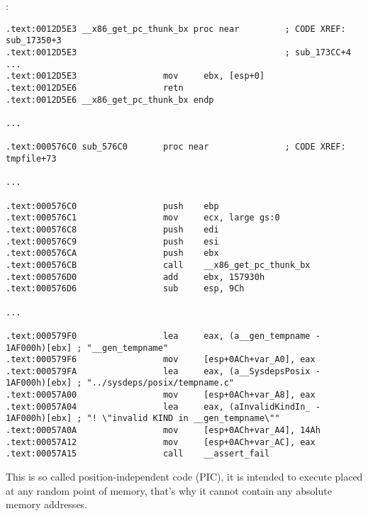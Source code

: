 ﻿\section{\CapitalPICcode}
\index{\PICcode}
\label{sec:PIC}

:

\begin{lstlisting}[caption=libc-2.17.so x86]
.text:0012D5E3 __x86_get_pc_thunk_bx proc near         ; CODE XREF: sub_17350+3
.text:0012D5E3                                         ; sub_173CC+4 ...
.text:0012D5E3                 mov     ebx, [esp+0]
.text:0012D5E6                 retn
.text:0012D5E6 __x86_get_pc_thunk_bx endp

...

.text:000576C0 sub_576C0       proc near               ; CODE XREF: tmpfile+73

...

.text:000576C0                 push    ebp
.text:000576C1                 mov     ecx, large gs:0
.text:000576C8                 push    edi
.text:000576C9                 push    esi
.text:000576CA                 push    ebx
.text:000576CB                 call    __x86_get_pc_thunk_bx
.text:000576D0                 add     ebx, 157930h
.text:000576D6                 sub     esp, 9Ch

...

.text:000579F0                 lea     eax, (a__gen_tempname - 1AF000h)[ebx] ; "__gen_tempname"
.text:000579F6                 mov     [esp+0ACh+var_A0], eax
.text:000579FA                 lea     eax, (a__SysdepsPosix - 1AF000h)[ebx] ; "../sysdeps/posix/tempname.c"
.text:00057A00                 mov     [esp+0ACh+var_A8], eax
.text:00057A04                 lea     eax, (aInvalidKindIn_ - 1AF000h)[ebx] ; "! \"invalid KIND in __gen_tempname\""
.text:00057A0A                 mov     [esp+0ACh+var_A4], 14Ah
.text:00057A12                 mov     [esp+0ACh+var_AC], eax
.text:00057A15                 call    __assert_fail
\end{lstlisting}

{This is so called position-independent code (PIC), it is intended to execute placed at any random point of memory, that's why it cannot contain any absolute memory addresses}.

